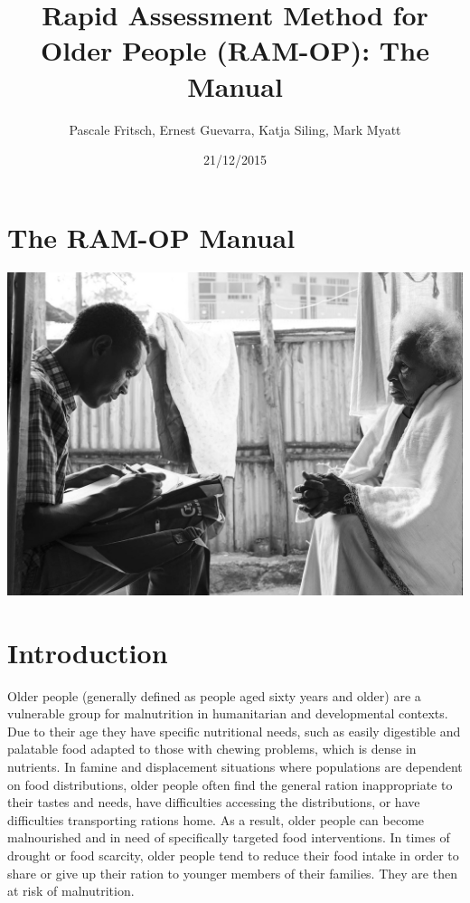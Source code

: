 \documentclass[12pt,a4paper]{book}
\title{Rapid Assessment Method for Older People (RAM-OP): The Manual}
\author{Pascale Fritsch, Ernest Guevarra, Katja Siling, Mark Myatt}
\date{21/12/2015}
\theoremstyle{definition}
\theoremstyle{definition}
\theoremstyle{definition}
\theoremstyle{remark}
\begin{document}
\maketitle

{
\hypersetup{linkcolor=black}
\setcounter{tocdepth}{1}
\tableofcontents
}
\hypertarget{the-ram-op-manual}{%
\chapter*{The RAM-OP Manual}\label{the-ram-op-manual}}

\includegraphics{figures/coverImage.jpg}

\hypertarget{introduction}{%
\chapter*{Introduction}\label{introduction}}

Older people (generally defined as people aged sixty years and older)
are a vulnerable group for malnutrition in humanitarian and
developmental contexts. Due to their age they have specific nutritional
needs, such as easily digestible and palatable food adapted to those
with chewing problems, which is dense in nutrients. In famine and
displacement situations where populations are dependent on food
distributions, older people often find the general ration inappropriate
to their tastes and needs, have difficulties accessing the
distributions, or have difficulties transporting rations home. As a
result, older people can become malnourished and in need of specifically
targeted food interventions. In times of drought or food scarcity, older
people tend to reduce their food intake in order to share or give up
their ration to younger members of their families. They are then at risk
of malnutrition.
\end{document}
